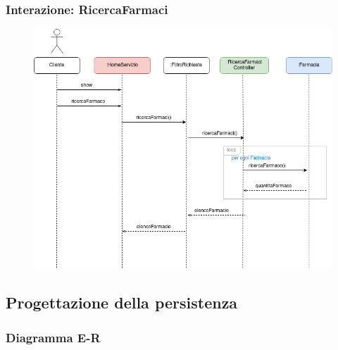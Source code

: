 \subsubsection*{Interazione: RicercaFarmaci}
\begin{figure}[h!]
    \begin{center}
        \includegraphics[width=\textwidth]{immagini/Interazione-RicercaFarmaco-progettaz.jpg}
    \end{center}
\end{figure}

\newpage

\subsection{Progettazione della persistenza}

\subsubsection*{Diagramma E-R}

